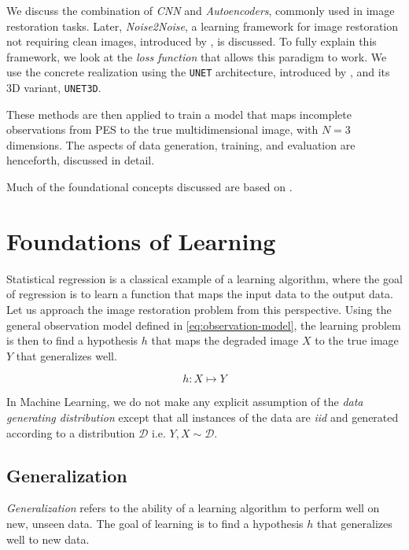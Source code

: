 We discuss the combination of \textit{\gls{CNN}} and \textit{Autoencoders}, commonly used in image restoration tasks. Later, \textit{Noise2Noise}, a learning framework for image restoration not requiring clean images, introduced by \citeauthor{lehtinenNoise2NoiseLearningImage2018}, is discussed. To fully explain this framework, we look at the \textit{loss function} that allows this paradigm to work. We use the concrete realization using the \texttt{UNET} architecture, introduced by \citeauthor{ronnebergerUNetConvolutionalNetworks}, and its 3D variant, \texttt{UNET3D}.

These methods are then applied to train a model that maps incomplete observations from \gls{PES} to the true multidimensional image, with $N=3$ dimensions. The aspects of data generation, training, and evaluation are henceforth, discussed in detail.

Much of the foundational concepts discussed are based on \cite{shalev-shwartzUnderstandingMachineLearning2014a,jamesIntroductionStatisticalLearning2013,tibshiraniElementsStatisticalLearning,goodfellowDeepLearning2016}.

\section{Foundations of Learning}
Statistical regression is a classical example of a learning algorithm, where the goal of regression is to learn a function that maps the input data to the output data.
Let us approach the image restoration problem from this perspective. Using the general observation model defined in \cref{eq:observation-model}, the learning problem is then to find a hypothesis $h$ that maps the degraded image $X$ to the true image $Y$ that generalizes well.

\begin{equation}
    h: X \mapsto Y
\end{equation}

In Machine Learning, we do not make any explicit assumption of the \textit{data generating distribution} except that all instances of the data are \textit{\gls{iid}} and generated according to a distribution $\mathcal{D}$ i.e. $Y, X \sim \mathcal{D}$.

\subsection{Generalization}
\textit{Generalization} refers to the ability of a learning algorithm to perform well on new, unseen data. The goal of learning is to find a hypothesis $h$ that generalizes well to new data. 

